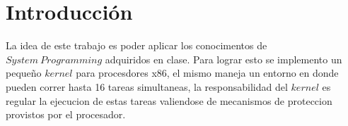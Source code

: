 \section{Introducción}

La idea de este trabajo es poder aplicar los conocimentos de $System\ Programming$ adquiridos en clase. Para lograr esto se implemento un pequeño $kernel$ para procesdores x86, el mismo maneja un entorno en donde pueden correr hasta 16 tareas simultaneas, la responsabilidad del $kernel$ es regular la ejecucion de estas tareas valiendose de mecanismos de proteccion provistos por el procesador.